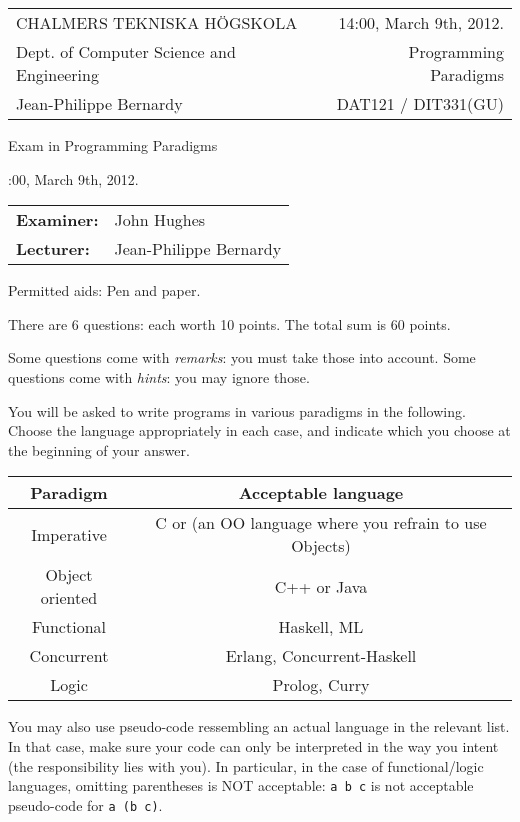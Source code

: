 \documentclass{article}
\begin{document}
\newcommand{\examtime}{14:00, March 9th, 2012}
\newcommand{\points}[1]{\marginpar{\bf #1 points}}
\noindent
\begin{tabular}{lr}
CHALMERS TEKNISKA H\"OGSKOLA &\examtime{}.\\
Dept. of Computer Science and Engineering & Programming Paradigms\\
Jean-Philippe Bernardy                 & DAT121 / DIT331(GU) \\
\end{tabular}

\vspace{2.5cm} \noindent
\begin{center} {\LARGE
Exam in Programming Paradigms}
\end{center}

\vspace{1.5cm}

\noindent
\examtime{}.\\
\begin{tabular}{ll}
\textbf{Examiner:} &  John Hughes  \\
\textbf{Lecturer:} & Jean-Philippe Bernardy
\end{tabular}
\vspace{1cm}

\noindent
Permitted aids: Pen and paper. 

There are 6 questions: each worth 10 points. The total sum is 60
points.  

Some questions come with \emph{remarks}: you must take those
into account.  Some questions come with \emph{hints}: you may ignore
those.

You will be asked to write programs in various paradigms in the
following. Choose the language appropriately in each case, and
indicate which you choose at the beginning of your answer.

\begin{tabular}[p]{cc}
  Paradigm & Acceptable language \\ \hline
  Imperative   & C or (an OO language where you refrain to use Objects) \\
  Object oriented & C++ or Java \\
  Functional & Haskell, ML \\
  Concurrent & Erlang, Concurrent-Haskell \\
  Logic & Prolog, Curry 
\end{tabular}

You may also use pseudo-code ressembling an actual language in the
relevant list. In that case, make sure your code can only be
interpreted in the way you intent (the responsibility lies with
you). In particular, in the case of functional/logic languages,
omitting parentheses is NOT acceptable: \texttt{a b c} is not
acceptable pseudo-code for \texttt{a (b c)}.
\end{document}
